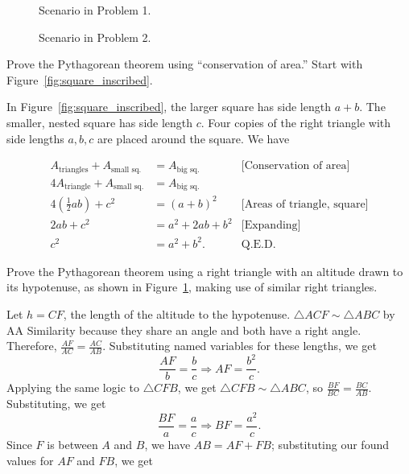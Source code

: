 \documentclass[../key.tex]{subfiles}
\begin{document}
\begin{figure}[h]
\begin{center}
\begin{minipage}[b]{0.45\textwidth}
\begin{asy}[width=0.7\textwidth]
			\end{asy}
		\end{minipage}
	\end{center}
	\vspace*{-2\baselineskip}
	\begin{center}
		\begin{minipage}[t]{0.45\textwidth}
			\caption{Scenario in Problem 1.}
			\label{fig:square_inscribed}
		\end{minipage}
		\hfill
		\begin{minipage}[t]{0.45\textwidth}
			\caption{Scenario in Problem 2.}
			\label{fig:pythag_sim_tri}
		\end{minipage}
	\end{center}
	\vspace*{-2\baselineskip}
\end{figure}

\begin{outer_problem}
\item Prove the Pythagorean theorem using ``conservation of area.'' Start with Figure~\ref{fig:square_inscribed}.
\end{outer_problem}

\noindent In Figure~\ref{fig:square_inscribed}, the larger square has side length $a+b$. The smaller, nested square has side length $c$. Four copies of the right triangle with side lengths $a,b,c$ are placed around the square. We have

\begin{align*}
A_{\text{triangles}} + A_{\text{small sq.}} &= A_{\text{big sq.}} & \text{[Conservation of area]} \\
4A_{\text{triangle}} + A_{\text{small sq.}} &= A_{\text{big sq.}} \\
4\left(\frac{1}{2}ab\right) + c^2 &= (a+b)^2 & \text{[Areas of triangle, square]} \\
2ab + c^2 &= a^2+2ab+b^2 & \text{[Expanding]} \\
c^2 &= a^2+b^2. & \text{Q.E.D.}
\end{align*}

\begin{outer_problem}
\item Prove the Pythagorean theorem using a right triangle with an altitude drawn to its hypotenuse, as shown in Figure~\ref{fig:pythag_sim_tri}, making use of similar right triangles.
\end{outer_problem}

\noindent Let $h=CF$, the length of the altitude to the hypotenuse. $\triangle ACF\sim \triangle ABC$ by AA Similarity because they share an angle and both have a right angle. Therefore, $\frac{AF}{AC}=\frac{AC}{AB}$. Substituting named variables for these lengths, we get $$\frac{AF}{b}=\frac{b}{c}\Longrightarrow AF = \frac{b^2}{c}.$$ Applying the same logic to $\triangle CFB$,
 we get $\triangle CFB\sim \triangle ABC$, so $\frac{BF}{BC}=\frac{BC}{AB}.$ Substituting, we get $$\frac{BF}{a}=\frac{a}{c} \Longrightarrow BF=\frac{a^2}{c}.$$ Since $F$ is between $A$ and $B$, we have $AB=AF+FB$; substituting our found values for $AF$ and $FB$, we get
\end{document}
